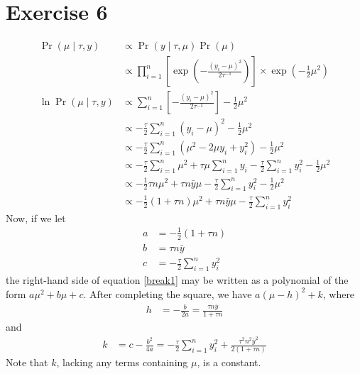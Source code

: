 \documentclass[letterpaper]{amsart}
\begin{document}
\section*{Exercise 6}
\begin{align}
  \Pr(\mu\mid\tau, y)
  &\propto
    \Pr(y\mid\tau, \mu)
    \Pr(\mu)
  \\
  &\propto
    \prod_{i=1}^n
    \left[
    \exp\left(-\frac{\left(y_i-\mu\right)^2}{2\tau^{-1}}\right)
    \right]
    \times
    \exp\left(-\frac{1}{2}\mu^2\right)
  \\
  \ln
  \Pr(\mu\mid\tau, y)
  &\propto
    \sum_{i=1}^n
    \left[
    -\frac{\left(y_i-\mu\right)^2}{2\tau^{-1}}
    \right]
    -\frac{1}{2}\mu^2
  \\
  &\propto
    -\frac{\tau}{2}
    \sum_{i=1}^n
    \left(y_i-\mu\right)^2
    -\frac{1}{2}\mu^2
  \\
  &\propto
    -\frac{\tau}{2}
    \sum_{i=1}^n
    \left(\mu^2-2\mu y_i + y_i^2\right)
    -\frac{1}{2}\mu^2
  \\
  &\propto
    -\frac{\tau}{2}
    \sum_{i=1}^n \mu^2
    +\tau\mu\sum_{i=1}^n y_i
    -\frac{\tau}{2}
    \sum_{i=1}^n y_i^2
    -\frac{1}{2}\mu^2
  \\
  &\propto
    -\frac{1}{2}
    \tau n \mu^2
    +\tau n\bar{y}\mu
    -\frac{\tau}{2}
    \sum_{i=1}^n y_i^2
    -\frac{1}{2}\mu^2
  \\
  \label{break1}
  &\propto
    -\frac{1}{2}
    \left(1+\tau n\right) \mu^2
    +\tau n\bar{y}\mu
    -\frac{\tau}{2}
    \sum_{i=1}^n y_i^2
\end{align}
Now, if we let
\begin{align}
  a &=
      -\frac{1}{2}
      \left(1+\tau n\right)
  \\
  b &=
      \tau n\bar{y}
  \\
  c &=
      -\frac{\tau}{2}
      \sum_{i=1}^n y_i^2
\end{align}
the right-hand side of equation \ref{break1} may be written as a polynomial of the form
$a\mu^2 + b\mu + c$.
After completing the square, we have
$a\left(\mu - h\right)^2+k$,
where
\begin{align}
  h &= -\frac{b}{2a}
      = \frac{\tau n\bar{y}}{1+\tau n}
\end{align}
and
\begin{align}
  k &= c-\frac{b^2}{4a}
      = -\frac{\tau}{2}
      \sum_{i=1}^n y_i^2
      +\frac{\tau^2 n^2\bar{y}^2}{2\left(1+\tau n\right)}
\end{align}
Note that $k$, lacking any terms containing $\mu$, is a constant.
\end{document}
